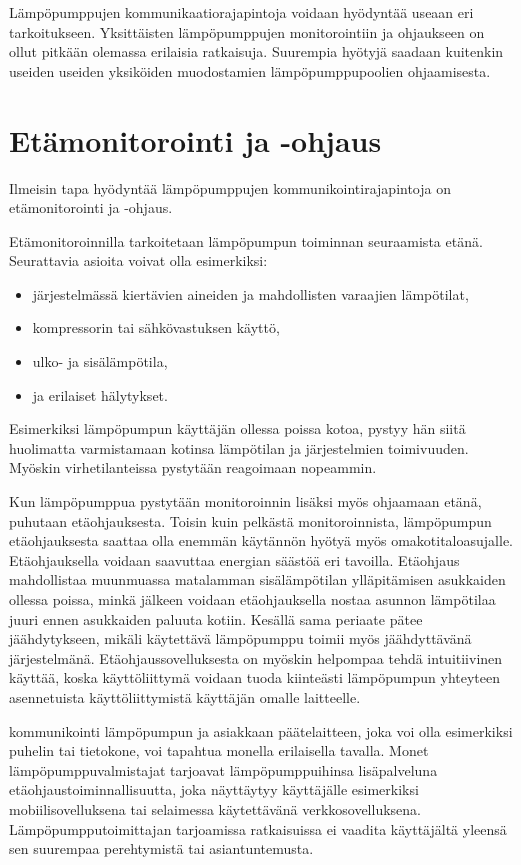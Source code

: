 Lämpöpumppujen kommunikaatiorajapintoja voidaan hyödyntää useaan eri tarkoitukseen. Yksittäisten lämpöpumppujen monitorointiin ja ohjaukseen on ollut pitkään olemassa erilaisia ratkaisuja.  Suurempia hyötyjä saadaan kuitenkin useiden useiden yksiköiden muodostamien lämpöpumppupoolien ohjaamisesta.


\section{Etämonitorointi ja -ohjaus}

  Ilmeisin tapa hyödyntää lämpöpumppujen kommunikointirajapintoja on etämonitorointi ja -ohjaus.

  Etämonitoroinnilla tarkoitetaan lämpöpumpun toiminnan seuraamista etänä. Seurattavia asioita voivat olla esimerkiksi:
  \begin{itemize}
    \item järjestelmässä kiertävien aineiden ja mahdollisten varaajien lämpötilat,
    \item kompressorin tai sähkövastuksen käyttö,
    \item ulko- ja sisälämpötila,
    \item ja erilaiset hälytykset.
  \end{itemize} \parencite{Latomaki}
  Esimerkiksi lämpöpumpun käyttäjän ollessa poissa kotoa, pystyy hän siitä huolimatta varmistamaan kotinsa lämpötilan ja järjestelmien toimivuuden. Myöskin virhetilanteissa pystytään reagoimaan nopeammin.

  Kun lämpöpumppua pystytään monitoroinnin lisäksi myös ohjaamaan etänä, puhutaan etäohjauksesta. Toisin kuin pelkästä monitoroinnista, lämpöpumpun etäohjauksesta saattaa olla enemmän käytännön hyötyä myös omakotitaloasujalle. Etäohjauksella voidaan saavuttaa energian säästöä eri tavoilla. Etäohjaus mahdollistaa muunmuassa matalamman sisälämpötilan ylläpitämisen asukkaiden ollessa poissa, minkä jälkeen voidaan etäohjauksella nostaa asunnon lämpötilaa juuri ennen asukkaiden paluuta kotiin. Kesällä sama periaate pätee jäähdytykseen, mikäli käytettävä lämpöpumppu toimii myös jäähdyttävänä järjestelmänä. Etäohjaussovelluksesta on myöskin helpompaa tehdä intuitiivinen käyttää, koska käyttöliittymä voidaan tuoda kiinteästi lämpöpumpun yhteyteen asennetuista käyttöliittymistä käyttäjän omalle laitteelle.

  kommunikointi lämpöpumpun ja asiakkaan päätelaitteen, joka voi olla esimerkiksi puhelin tai tietokone, voi tapahtua monella erilaisella tavalla. Monet lämpöpumppuvalmistajat  tarjoavat lämpöpumppuihinsa lisäpalveluna etäohjaustoiminnallisuutta, joka näyttäytyy käyttäjälle esimerkiksi mobiilisovelluksena tai selaimessa käytettävänä verkkosovelluksena.  Lämpöpumpputoimittajan tarjoamissa ratkaisuissa ei vaadita käyttäjältä yleensä sen suurempaa perehtymistä tai asiantuntemusta.

